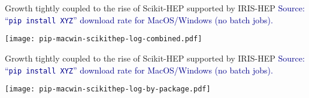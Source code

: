 \begin{frame}{Growth tightly coupled to the rise of Scikit-HEP supported by IRIS-HEP}
\vspace{0.25 cm}
\textcolor{darkblue}{Source: ``\texttt{pip install XYZ}'' download rate for MacOS/Windows (no batch jobs).}

\vspace{0.1 cm}
\texttt{[image: pip-macwin-scikithep-log-combined.pdf]}
\end{frame}

\begin{frame}{Growth tightly coupled to the rise of Scikit-HEP supported by IRIS-HEP}
\vspace{0.25 cm}
\textcolor{darkblue}{Source: ``\texttt{pip install XYZ}'' download rate for MacOS/Windows (no batch jobs).}

\vspace{0.1 cm}
\texttt{[image: pip-macwin-scikithep-log-by-package.pdf]}
\end{frame}

